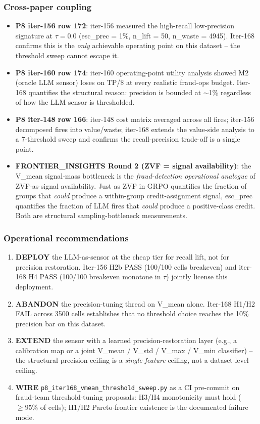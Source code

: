 \subsubsection{Cross-paper coupling}
\begin{itemize}
\item \textbf{P8 iter-156 row 172}: iter-156 measured the
high-recall low-precision signature at $\tau=0.0$ (esc\_prec = 1\%,
n\_lift = 50, n\_waste = 4945). Iter-168 confirms this is the
\emph{only} achievable operating point on this dataset -- the
threshold sweep cannot escape it.
\item \textbf{P8 iter-160 row 174}: iter-160 operating-point utility
analysis showed M2 (oracle LLM sensor) loses on TP/\$ at every
realistic fraud-ops budget. Iter-168 quantifies the structural
reason: precision is bounded at $\sim$1\% regardless of how the LLM
sensor is thresholded.
\item \textbf{P8 iter-148 row 166}: iter-148 cost matrix averaged
across all fires; iter-156 decomposed fires into value/waste;
iter-168 extends the value-side analysis to a 7-threshold sweep
and confirms the recall-precision trade-off is a single point.
\item \textbf{FRONTIER\_INSIGHTS Round 2 (ZVF = signal
availability)}: the V\_mean signal-mass bottleneck is the
\emph{fraud-detection operational analogue} of ZVF-as-signal
availability. Just as ZVF in GRPO quantifies the fraction of
groups that \emph{could} produce a within-group credit-assignment
signal, esc\_prec quantifies the fraction of LLM fires that
\emph{could} produce a positive-class credit. Both are structural
sampling-bottleneck measurements.
\end{itemize}

\subsubsection{Operational recommendations}
\begin{enumerate}
\item \textbf{DEPLOY} the LLM-as-sensor at the cheap tier for
recall lift, not for precision restoration. Iter-156 H2b PASS
(100/100 cells breakeven) and iter-168 H4 PASS (100/100 breakeven
monotone in $\tau$) jointly license this deployment.
\item \textbf{ABANDON} the precision-tuning thread on V\_mean alone.
Iter-168 H1/H2 FAIL across 3500 cells establishes that no
threshold choice reaches the 10\% precision bar on this dataset.
\item \textbf{EXTEND} the sensor with a learned precision-restoration
layer (e.g., a calibration map or a joint V\_mean / V\_std / V\_max /
V\_min classifier) -- the structural precision ceiling is a
\emph{single-feature} ceiling, not a dataset-level ceiling.
\item \textbf{WIRE} \texttt{p8\_iter168\_vmean\_threshold\_sweep.py}
as a CI pre-commit on fraud-team threshold-tuning proposals:
H3/H4 monotonicity must hold ($\geq 95\%$ of cells); H1/H2
Pareto-frontier existence is the documented failure mode.
\end{enumerate}

\clearpage